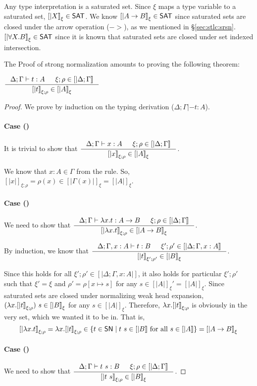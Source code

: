 Any type interpretation is a saturated set. Since $\xi$ maps a type variable
to a saturated set, $[|X|]_\xi \in \mathsf{SAT}$. We know $[|A -> B|]_\xi \in \mathsf{SAT}$
since saturated sets are closed under the arrow operation ($->$), as we
mentioned in \S\ref{sec:stlc:srsn}. $[|\forall X.B|]_\xi \in \mathsf{SAT}$ since
it is known that saturated sets are closed under set indexed intersection.

The Proof of strong normalization amounts to proving the following theorem:
\begin{theorem}
$ \inference{\Delta;\Gamma|- t:A & \xi;\rho \in [|\Delta;\Gamma|]}
	    {[|t|]_{\xi;\rho} \in [|A|]_\xi} $
\end{theorem}
\begin{proof}
We prove by induction on the typing derivation ($\Delta;\Gamma|- t:A$).
\paragraph{Case ()}
It is trivial to show that
$ \inference{\Delta;\Gamma |- x:A & \xi;\rho \in [|\Delta;\Gamma|]}
	{[|x|]_{\xi;\rho} \in [|A|]_\xi} $.

We know that $x:A \in \Gamma$ from the  rule.
So, $[|x|]_{\xi;\rho} =\rho(x)\in[|\Gamma(x)|]_\xi = [|A|]_\xi$.

\paragraph{Case ()}
We need to show that
$ \inference{\Delta;\Gamma |- \l x.t : A -> B & \xi;\rho \in [|\Delta;\Gamma|]}
	{[|\l x.t|]_{\xi;\rho} \in [|A -> B|]_\xi} $.

By induction, we know that
$ \inference{\Delta;\Gamma,x:A |- t : B & \xi';\rho' \in [|\Delta;\Gamma,x:A|]}
	     {[|t|]_{\xi';\rho'} \in [|B|]_\xi} $.

Since this holds for all $\xi';\rho' \in [|\Delta;\Gamma,x:A|]$, it also holds
for particular $\xi';\rho'$ such that $\xi'=\xi$ and
$\rho' = \rho[x \mapsto s]$ for any $s \in [|A|]_\xi' = [|A|]_\xi$.
Since saturated sets are closed under normalizing weak head expansion,
$(\lambda x.[|t|]_{\xi;\rho})~s \in[|B|]_\xi$ for any $s\in[|A|]_\xi$.
Therefore, $\lambda x.[|t|]_{\xi;\rho}$ is obviously in the very set,
which we wanted it to be in. That is,
\[
[|\lambda x.t|]_{\xi;\rho} = \lambda x.[|t|]_{\xi;\rho}
\in \{t\in \mathsf{SN} \mid t~s\in[|B|] ~\text{for all}~ s\in[|A|]\} 
= [|A -> B|]_\xi
\]

\paragraph{Case ()}
We need to show that
$ \inference{\Delta;\Gamma |- t~s : B & \xi;\rho\in[|\Delta;\Gamma|]}{[|t~s|]_{\xi;\rho} \in [|B|]_\xi} $.


\end{proof}
